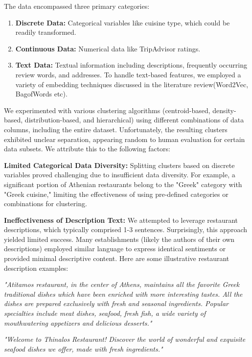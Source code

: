 \documentclass[12pt,a4paper]{report}
\begin{document}
The data encompassed three primary categories:
\begin{enumerate}
\item{\textbf{Discrete Data:} Categorical variables like cuisine type, which could be readily transformed.}
\item{\textbf{Continuous Data:} Numerical data like TripAdvisor ratings.}
\item{\textbf{Text Data:} Textual information including descriptions, frequently occurring review words, and addresses.
To handle text-based features, we employed a variety of embedding techniques discussed in the literature review(Word2Vec, BagofWords etc).}
\end{enumerate}
We experimented with various clustering algorithms (centroid-based, density-based, distribution-based, and hierarchical) using different combinations of data columns, including the entire dataset. Unfortunately, the resulting clusters exhibited unclear separation, appearing random to human evaluation for certain data subsets.  We attribute this to the following factors:
\begin{description}
\item{\textbf{Limited Categorical Data Diversity:} Splitting clusters based on discrete variables proved challenging due to insufficient data diversity. For example, a significant portion of Athenian restaurants belong to the "Greek" category with "Greek cuisine," limiting the effectiveness of using pre-defined categories or combinations for clustering.}
\item{\textbf{Ineffectiveness of Description Text:} We attempted to leverage restaurant descriptions, which typically comprised 1-3 sentences. Surprisingly, this approach yielded limited success. Many establishments (likely the authors of their own descriptions) employed similar language to express identical sentiments or provided minimal descriptive content.}
Here are some illustrative restaurant description examples:
\begin{description}
\item{\textit{"Atitamos restaurant, in the center of Athens, maintains all the favorite Greek traditional dishes which have been enriched with more interesting tastes. All the dishes are prepared exclusively with fresh and seasonal ingredients. Popular specialties include meat dishes, seafood, fresh fish, a wide variety of mouthwatering appetizers and delicious desserts."}}

\item{\textit{"Welcome to Thinalos Restaurant! Discover the world of wonderful and exquisite seafood dishes we offer, made with fresh ingredients."}}
\end{description}
\end{description}
\end{document}
